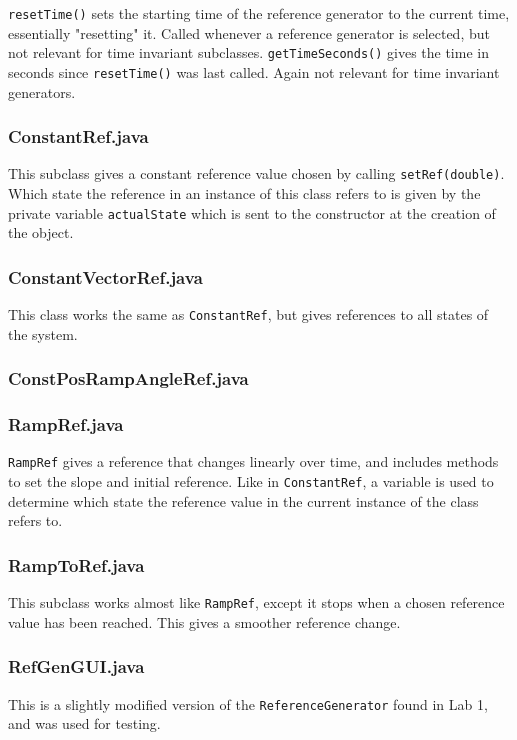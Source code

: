 \texttt{resetTime()} sets the starting time of the reference generator to the current time, essentially "resetting" it. Called whenever a reference generator is selected, but not relevant for time invariant subclasses.
\texttt{getTimeSeconds()} gives the time in seconds since \texttt{resetTime()} was last called. Again not relevant for time invariant generators.

\subsubsection{ConstantRef.java}
This subclass gives a constant reference value chosen by calling \texttt{setRef(double)}. Which state the reference in an instance of this class refers to is given by the private variable \texttt{actualState} which is sent to the constructor at the creation of the object.

\subsubsection{ConstantVectorRef.java}
This class works the same as \texttt{ConstantRef}, but gives references to all states of the system.

\subsubsection{ConstPosRampAngleRef.java}

\subsubsection{RampRef.java}
\texttt{RampRef} gives a reference that changes linearly over time, and includes methods to set the slope and initial reference. Like in \texttt{ConstantRef}, a variable is used to determine which state the reference value in the current instance of the class refers to.

\subsubsection{RampToRef.java}
This subclass works almost like \texttt{RampRef}, except it stops when a chosen reference value has been reached. This gives a smoother reference change.

\subsubsection{RefGenGUI.java}
This is a slightly modified version of the \texttt{ReferenceGenerator} found in Lab 1, and was used for testing.

